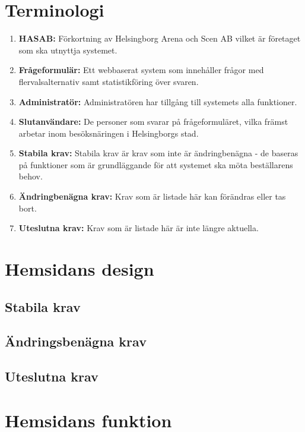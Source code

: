 \documentclass{article}
\begin{document}
    \section{Terminologi}
    \begin{enumerate}
        \item \textbf{HASAB:} Förkortning av Helsingborg Arena och Scen AB vilket är företaget som ska utnyttja systemet.
        \item \textbf{Frågeformulär:} Ett webbaserat system som innehåller frågor med flervalsalternativ samt statistikföring över svaren.
        \item \textbf{Administratör:} Administratören har tillgång till systemets alla funktioner.
        \item \textbf{Slutanvändare:}  De personer som svarar på frågeformuläret, vilka främst arbetar inom besöksnäringen i Helsingborgs stad. 
        \item\textbf{Stabila krav:}  Stabila krav är krav som inte är ändringbenägna - de baseras på funktioner som är grundläggande för att systemet ska möta beställarens behov.
        \item \textbf{Ändringbenägna krav:}  Krav som är listade här kan förändras eller tas bort.
        \item \textbf{Uteslutna krav:}  Krav som är listade här är inte längre aktuella.
    \end{enumerate}
    
    \section{Hemsidans design}
    
    \subsection{Stabila krav}
    \subsection{Ändringsbenägna krav}
    \subsection{Uteslutna krav}
    
    \section{Hemsidans funktion}
    
\end{document}
